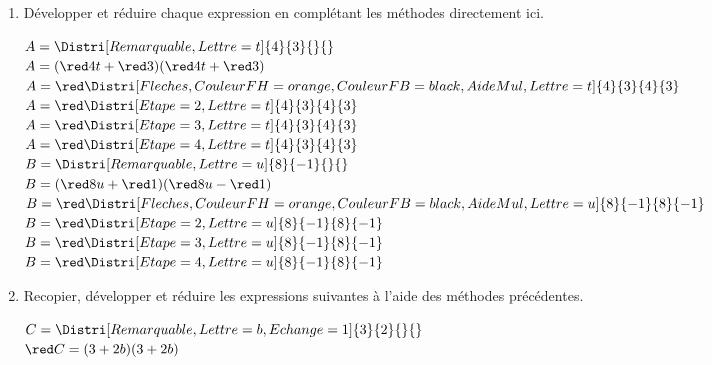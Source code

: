 \begin{corrige}
    \begin{enumerate}
        \item Développer et réduire chaque expression en complétant les méthodes directement ici.\\
        \begin{itemize}
            \def\item{}
            \begin{spacing}{1.2}
                \item $A=\Distri[Remarquable,Lettre=t]{4}{3}{}{}$\\
                $A=({\red 4t}+{\red 3})({\red 4t}+{\red 3})$\\\bigskip
                $A={\red \Distri[Fleches,CouleurFH=orange,CouleurFB=black,AideMul,Lettre=t]{4}{3}{4}{3}}$\\\bigskip
                $A={\red \Distri[Etape=2,Lettre=t]{4}{3}{4}{3}}$\\
                $A={\red \Distri[Etape=3,Lettre=t]{4}{3}{4}{3}}$\\
                $A={\red \Distri[Etape=4,Lettre=t]{4}{3}{4}{3}}$\\\medskip
                \item $B=\Distri[Remarquable,Lettre=u]{8}{-1}{}{}$\\
                $B=({\red 8u}+{\red 1})({\red 8u}-{\red 1})$\\\bigskip
                $B={\red \Distri[Fleches,CouleurFH=orange,CouleurFB=black,AideMul,Lettre=u]{8}{-1}{8}{-1}}$\\\bigskip
                $B={\red \Distri[Etape=2,Lettre=u]{8}{-1}{8}{-1}}$\\
                $B={\red \Distri[Etape=3,Lettre=u]{8}{-1}{8}{-1}}$\\
                $B={\red \Distri[Etape=4,Lettre=u]{8}{-1}{8}{-1}}$\\
            \end{spacing}
        \end{itemize}
    \end{enumerate}
    \Coupe 
    \begin{enumerate}
        \setcounter{enumi}{1}
        \item Recopier, développer et réduire les expressions suivantes à l'aide des méthodes précédentes.\\
        \begin{itemize}
            \def\item{}
            \begin{spacing}{1.2}
                \item $C=\Distri[Remarquable,Lettre=b,Echange=1]{3}{2}{}{}$\\
                ${\red C=(3+2b)(3+2b)}$


\end{spacing}
\end{itemize}
\end{enumerate}
\end{corrige}
